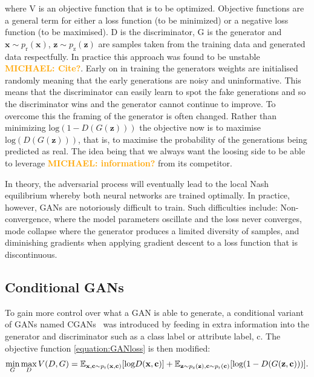\documentclass[12pt]{iopart}
\newcommand{\michael}[1]{\textbf{\textcolor{orange}{MICHAEL: #1}}}
\begin{document}
where V is an objective function that is to be optimized. Objective functions are a general term for either a loss function (to be minimized) or a negative loss function (to be maximised). D is the discriminator, G is the generator and ${\mathbf{x} \sim p_{\text{r}}(\mathbf{x})}$, ${\mathbf{z} \sim p_{\text{z}}(\mathbf{z})}$ are samples taken from the training data and generated data respectfully. In practice this approach was found to be unstable \michael{Cite?}. Early on in training the
generators weights are initialised randomly meaning that the early generations are noisy and uninformative. This means that the discriminator can easily learn to spot the fake generations and so the discriminator wins and the generator cannot continue to improve. To overcome this the framing of the generator is often changed. Rather than minimizing $\text{log}(1-D(G(\mathbf{z})))$ the objective now is to maximise $\text{log}(D(G(\mathbf{z})))$, that is, to maximise the probability of the
generations being predicted as real. The idea being that we always want the loosing side to be able to leverage \michael{information?} from its competitor. 
%

%
In theory, the adversarial process will eventually lead to the local Nash
equilibrium \cite{Nash1950} whereby both neural networks are trained
optimally. In practice, however, \acp{GAN} are notoriously difficult
to train. Such difficulties include: Non-convergence, where the model
parameters oscillate and the loss never converges, mode collapse where the generator produces a
limited diversity of samples, and diminishing
gradients when applying gradient descent to a loss function that is discontinuous.

\subsection{Conditional GANs}

%
To gain more control over what a GAN is able to generate, a conditional variant of \acp{GAN} named \acp{CGAN}~\cite{cgan} was introduced by feeding in extra information into the generator and discriminator such as a class label or attribute label, c. The objective function \cref{equation:GANloss}  is then modified:
\begin{equation}
  \mathop{\text{min}}_{G}  \mathop{\text{max}}_{D} V(D,G) = \mathbb{E}_{\mathbf{x,c} \sim p_{\text{r}}(\mathbf{x,c})} [\text{log} D(\mathbf{x,c})] \\ + \mathbb{E}_{\mathbf{z} \sim p_{\text{z}}(\mathbf{z}),\mathbf{c} \sim p_{\text{r}}(\mathbf{c})} [\text{log}(1-D(G(\mathbf{z,c})))].
\label{equation:cGANloss}
\end{equation}
\end{document}

